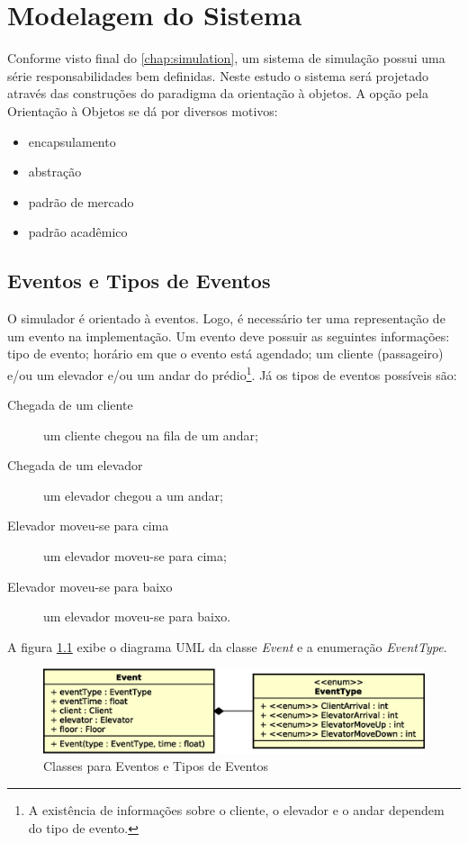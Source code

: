 \chapter{\label{chap:modeling}Modelagem do Sistema}

Conforme visto final do \ref{chap:simulation}, um sistema de simulação possui
uma série responsabilidades bem definidas. Neste estudo o sistema será projetado
através das construções do paradigma da orientação à objetos. A opção pela
Orientação à Objetos se dá por diversos motivos:

\begin{itemize}
  \item encapsulamento
  \item abstração
  \item padrão de mercado
  \item padrão acadêmico
\end{itemize}

\section{Eventos e Tipos de Eventos}

O simulador é orientado à eventos. Logo, é necessário ter uma representação de
um evento na implementação. Um evento deve possuir as seguintes informações:
tipo de evento; horário em que o evento está agendado; um cliente (passageiro)
e/ou um elevador e/ou um andar do prédio\footnote{A existência de informações
sobre o cliente, o elevador e o andar dependem do tipo de evento.}. Já os tipos
de eventos possíveis são:

\begin{description}
  \item[Chegada de um cliente] um cliente chegou na fila de um andar;
  \item[Chegada de um elevador] um elevador chegou a um andar;
  \item[Elevador moveu-se para cima] um elevador moveu-se para cima;
  \item[Elevador moveu-se para baixo] um elevador moveu-se para baixo.
\end{description}

A figura \ref{fig:diagram:event} exibe o diagrama UML da classe \textit{Event} e
a enumeração \textit{EventType}.

\begin{figure}[htb!]
  \centering
  \includegraphics[scale=0.6]{img/event.eps}
  \caption{Classes para Eventos e Tipos de Eventos}
\label{fig:diagram:event}
\end{figure}

